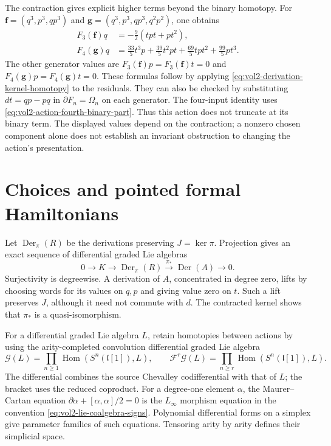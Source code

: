 The contraction gives explicit higher terms beyond the binary
homotopy. For
$\mathbf f=(q^3,p^3,qp^3)$ and
$\mathbf g=(q^3,p^3,qp^3,q^2p^2)$, one obtains
\begin{equation}\label{eq:vol2-derived-higher-examples}
 \begin{aligned}
 F_3(\mathbf f)q&=-\frac92(tpt+pt^2),\\
 F_4(\mathbf g)q&=\frac{33}{5}t^3p+\frac{39}{5}t^2pt
                   +\frac{69}{5}tpt^2+\frac{99}{5}pt^3.
 \end{aligned}
\end{equation}
The other generator values are
$F_3(\mathbf f)p=F_3(\mathbf f)t=0$ and
$F_4(\mathbf g)p=F_4(\mathbf g)t=0$.
These formulas follow by applying
\eqref{eq:vol2-derivation-kernel-homotopy} to the residuals.
They can also be checked by substituting $dt=qp-pq$ in
$\partial F_n=\Omega_n$ on each generator. The four-input
identity uses \eqref{eq:vol2-action-fourth-binary-part}.
Thus this action does not truncate at its binary term.
The displayed values depend on the contraction; a nonzero
chosen component alone does not establish an invariant
obstruction to changing the action's presentation.

\section{Choices and pointed formal Hamiltonians}
\label{sec:vol2-derived-action-choices}

Let $\operatorname{Der}_\pi(R)$ be the derivations preserving
$J=\ker\pi$. Projection gives an exact sequence of differential
graded Lie algebras
\begin{equation}\label{eq:vol2-derived-action-fibration}
 0\longrightarrow K\longrightarrow\operatorname{Der}_\pi(R)
   \xrightarrow{\pi_*}\operatorname{Der}(A)\longrightarrow0.
\end{equation}
Surjectivity is degreewise. A derivation of $A$, concentrated in
degree zero, lifts by choosing words for its values on $q,p$
and giving value zero on $t$. Such a lift preserves $J$, although
it need not commute with $d$. The contracted kernel shows that
$\pi_*$ is a quasi-isomorphism.

For a differential graded Lie algebra $L$, retain homotopies
between actions by using the arity-completed
convolution differential graded Lie algebra
\[
 \mathcal G(L)=\prod_{n\geq1}
    \operatorname{Hom}(S^n(\mathfrak l[1]),L),
 \qquad
 \mathcal F^r\mathcal G(L)=\prod_{n\geq r}
    \operatorname{Hom}(S^n(\mathfrak l[1]),L).
\]
The differential combines the source Chevalley codifferential
with that of $L$; the bracket uses the reduced coproduct.
For a degree-one element $\alpha$, the Maurer--Cartan equation
$\partial\alpha+[\alpha,\alpha]/2=0$ is the $L_\infty$
morphism equation in the convention
\eqref{eq:vol2-lie-coalgebra-signs}. Polynomial differential
forms on a simplex give parameter families of such equations.
Tensoring arity by arity defines their simplicial space.

